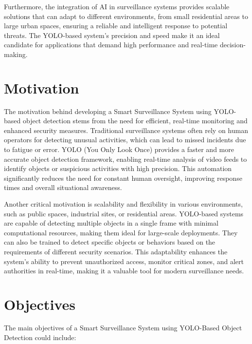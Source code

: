 \documentclass[openany,12pt]{report}
\begin{document}
Furthermore, the integration of AI in surveillance systems provides scalable solutions that can adapt to different environments, from small residential areas to large urban spaces, ensuring a reliable and intelligent response to potential threats. The YOLO-based system's precision and speed make it an ideal candidate for applications that demand high performance and real-time decision-making.
\\

\chapter{Motivation}
\hspace*{0.5in}The motivation behind developing a Smart Surveillance System using YOLO-based object detection stems from the need for efficient, real-time monitoring and enhanced security measures. Traditional surveillance systems often rely on human operators for detecting unusual activities, which can lead to missed incidents due to fatigue or error. YOLO (You Only Look Once) provides a faster and more accurate object detection framework, enabling real-time analysis of video feeds to identify objects or suspicious activities with high precision. This automation significantly reduces the need for constant human oversight, improving response times and overall situational awareness.

Another critical motivation is scalability and flexibility in various environments, such as public spaces, industrial sites, or residential areas. YOLO-based systems are capable of detecting multiple objects in a single frame with minimal computational resources, making them ideal for large-scale deployments. They can also be trained to detect specific objects or behaviors based on the requirements of different security scenarios. This adaptability enhances the system's ability to prevent unauthorized access, monitor critical zones, and alert authorities in real-time, making it a valuable tool for modern surveillance needs.
\hspace*

\chapter{Objectives}
\hspace*{0.5in}The main objectives of a Smart Surveillance System using YOLO-Based Object Detection could include:
\end{document}
